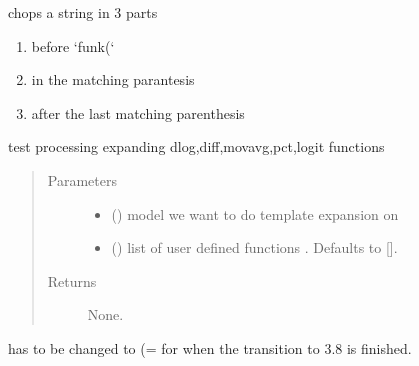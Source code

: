 \documentclass[letterpaper,10pt,english]{sphinxmanual}
\begin{document}

\begin{fulllineitems}
\label{\detokenize{onboard/modelnormalize:modelnormalize.funk_find_arg}}
\pysigstartsignatures
{}
\pysigstopsignatures
\sphinxAtStartPar
chops a string in 3 parts
\begin{enumerate}
%
\item {} 
\sphinxAtStartPar
before ‘funk(‘

\item {} 
\sphinxAtStartPar
in the matching parantesis

\item {} 
\sphinxAtStartPar
after the last matching parenthesis

\end{enumerate}

\end{fulllineitems}


\begin{fulllineitems}
\label{\detokenize{onboard/modelnormalize:modelnormalize.preprocess}}
\pysigstartsignatures
{}
\pysigstopsignatures
\sphinxAtStartPar
test processing expanding dlog,diff,movavg,pct,logit functions
\begin{quote}\begin{description}
\item[{Parameters}] \leavevmode\begin{itemize}
\item {} 
\sphinxAtStartPar
{} () \textendash{} model we want to do template expansion on

\item {} 
\sphinxAtStartPar
{} (\sphinxstyleliteralemphasis{\sphinxupquote{, }}) \textendash{} list of user defined functions . Defaults to {[}{]}.

\end{itemize}

\item[{Returns}] \leavevmode
\sphinxAtStartPar
None.

\end{description}\end{quote}

\sphinxAtStartPar
has to be changed to (= for when the transition to 3.8 is finished.

\end{fulllineitems}
\end{document}
